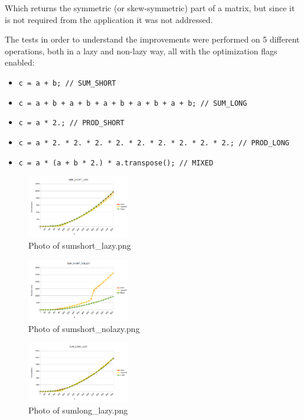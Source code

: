 \documentclass{article}
\begin{document}
Which returns the symmetric (or skew-symmetric) part of a matrix, but since it is not required from the application it was not addressed.

The tests in order to understand the improvements were performed on 5 different operations, both in a lazy and non-lazy way, all with the optimization flags enabled:

\begin{itemize}
    \item \texttt{c = a + b; // SUM\_SHORT}
    \item \texttt{c = a + b + a + b + a + b + a + b + a + b; // SUM\_LONG}
    \item \texttt{c = a * 2.; // PROD\_SHORT}
    \item \texttt{c = a * 2. * 2. * 2. * 2. * 2. * 2. * 2. * 2. * 2.; // PROD\_LONG}
    \item \texttt{c = a * (a + b * 2.) * a.transpose(); // MIXED}
\end{itemize}

\begin{figure}[htbp]
    \centering
    \includegraphics[width=0.4\textwidth]{sumshort_lazy.png}
    \caption{Photo of sumshort\_lazy.png}
\end{figure}

\begin{figure}[htbp]
    \centering
    \includegraphics[width=0.4\textwidth]{sumshort_nolazy.png}
    \caption{Photo of sumshort\_nolazy.png}
\end{figure}

\begin{figure}[htbp]
    \centering
    \includegraphics[width=0.4\textwidth]{sumlong_lazy.png}
    \caption{Photo of sumlong\_lazy.png}
\end{figure}
\end{document}
